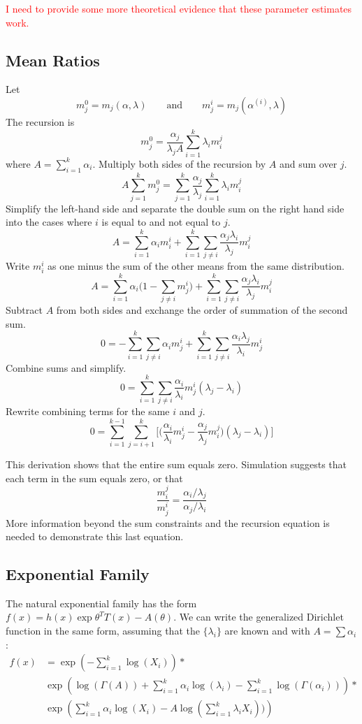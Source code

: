 \documentclass[ba]{imsart}
\numberwithin{equation}{section}
\theoremstyle{plain}
\newcommand{\falta}[1]{\textcolor{red}{#1}}
\begin{document}
\falta{I need to provide some more theoretical evidence that these
  parameter estimates work.}

\subsection{Mean Ratios}
Let
$$
m_j^0 = m_j(\alpha,\lambda) \qquad \text{and} \qquad m_j^i = m_j(\alpha^{(i)},\lambda)
$$
The recursion is
$$
m_j^0 = \frac{\alpha_j}{\lambda_jA} \sum_{i=1}^k \lambda_i m_i^j
$$
where $A = \sum_{i=1}^k \alpha_i$.
Multiply both sides of the recursion by $A$ and sum over $j$.
$$
A \sum_{j=1}^k m_j^0 = \sum_{j=1}^k \frac{\alpha_j}{\lambda_j} \sum_{i=1}^k \lambda_i m_i^j
$$
Simplify the left-hand side and separate the double sum on the right hand side into the cases where $i$ is equal to and not equal to $j$.
$$
A = \sum_{i=1}^k \alpha_i m_i^i + \sum_{i=1}^k \sum_{j \neq i} \frac{\alpha_j\lambda_i}{\lambda_j} m_i^j
$$
Write $m_i^i$ as one minus the sum of the other means from the same distribution.
$$
A = \sum_{i=1}^k \alpha_i \Big(1 - \sum_{j \neq i} m_j^i\Big) + \sum_{i=1}^k \sum_{j \neq i} \frac{\alpha_j\lambda_i}{\lambda_j} m_i^j
$$
Subtract $A$ from both sides
and exchange the order of summation of the second sum.
$$
0 =  - \sum_{i=1}^k \sum_{j \neq i} \alpha_i m_j^i + \sum_{i=1}^k \sum_{j \neq i} \frac{\alpha_i\lambda_j}{\lambda_i} m_j^i
$$
Combine sums and simplify.
$$
0 =  \sum_{i=1}^k \sum_{j \neq i}  \frac{\alpha_i}{\lambda_i} m_j^i (\lambda_j - \lambda_i)
$$
Rewrite combining terms for the same $i$ and $j$.
$$
0 =  \sum_{i=1}^{k-1} \sum_{j = i+1}^k \Big[\Big(\frac{\alpha_i}{\lambda_i} m_j^i - \frac{\alpha_j}{\lambda_j}m_i^j\Big) (\lambda_j - \lambda_i)\Big]
$$

This derivation shows that the entire sum equals zero.
Simulation suggests that each term in the sum equals zero,
or that
$$
\frac{m_i^j}{m_j^i} = \frac{\alpha_i/\lambda_j}{\alpha_j/\lambda_i}
$$
More information beyond the sum constraints and the recursion equation
is needed to demonstrate this last equation.



\subsection{Exponential Family}
The natural exponential family has the form $f(x) =
h(x)\exp{\theta^TT(x)-A(\theta)}$. We can write the generalized
Dirichlet function in the same form, assuming that the $\{\lambda_i\}$
are known and with $A=\sum \alpha_i$:
\begin{align*}
f(x) & = \exp \left( -\sum_{i=1}^k \log(X_i) \right) * \\
& \exp \left( \log(\Gamma(A)) + \sum_{i=1}^k \alpha_i \log(\lambda_i)
  -\sum_{i=1}^k \log(\Gamma(\alpha_i))  \right) * \\
& \exp \left( \sum_{i=1}^k \alpha_i \log(X_i) -A \log(\sum_{i=1}^k \lambda_iX_i)) \right)
\end{align*}
\end{document}

